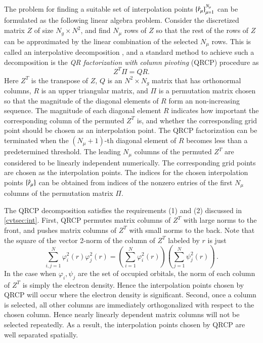The problem for finding a suitable set of interpolation points $\{\hat{r}_\mu\}_
{\mu=1}^{N_{\mu}}$ can be formulated as the following linear algebra problem.
Consider the discretized matrix $Z$ of size $N_{g}\times N^2$, and find $N_
{\mu}$ rows of $Z$ so that the rest of the rows of $Z$ can be approximated by
the linear combination of the selected $N_{\mu}$ rows. This is called an
interpolative decomposition \cite{SIAM_13_727_1992_QRCP}, and a standard method
to achieve such a decomposition is the \emph{QR factorization with column
pivoting} (QRCP) procedure \cite{SIAM_13_727_1992_QRCP} as
\begin{equation}\label{eqn:QRCP}
  Z^{T} \Pi = QR.
\end{equation}
Here $Z^T$ is the transpose of $Z$, $Q$ is an $N^2 \times N_g$ matrix that
has orthonormal columns, $R$ is an upper triangular matrix, and $\Pi$ is a
permutation matrix chosen so that the magnitude of the diagonal elements of
$R$ form an non\hyp{}increasing sequence.  The magnitude of each diagonal
element $R$ indicates how important the corresponding column of the permuted
$Z^T$ is, and whether the corresponding grid point should be chosen as an
interpolation point. The QRCP factorization can be terminated when the $(N_
{\mu}+1)$-th diagonal element of $R$ becomes less than a predetermined
threshold. The leading $N_{\mu}$ columns of the permuted $Z^T$ are considered to
be linearly independent numerically. The corresponding grid points are chosen
as the interpolation points. The indices for the chosen interpolation points 
$\{\hat{r}_\mu\}$ can be obtained from indices of the nonzero entries of the first
$N_{\mu}$ columns of the permutation matrix $\Pi$.

The QRCP decomposition satisfies the requirements (1) and (2) discussed in 
\cref{cvtsec:int}. First, QRCP permutes matrix columns of $Z^{T}$ with large
norms to the front, and pushes matrix columns of $Z^{T}$ with small norms to
the back. Note that the square of the vector 2\hyp{}norm of the column of $Z^
{T}$ labeled by $r$ is just
\begin{equation}\label{eqn:Znorm}
  \sum_{i,j=1}^{N} \varphi_{i}^2(r) \varphi_{j}^2(r) = \left(\sum_{i=1}^{N}
  \varphi_{i}^2(r)\right) \left(\sum_{j=1}^{N}\psi_{j}^2(r)\right)\,.
\end{equation}
In the case when $\varphi_{i},\psi_{j}$ are the set of occupied orbitals, the
norm of each column of $Z^{T}$ is simply the electron density. Hence the
interpolation points chosen by QRCP will occur where the electron density is
significant. Second, once a column is selected, all other columns are
immediately orthogonalized with respect to the chosen column. Hence nearly
linearly dependent matrix columns will not be selected repeatedly. As a result,
the interpolation points chosen by QRCP are well separated spatially.

